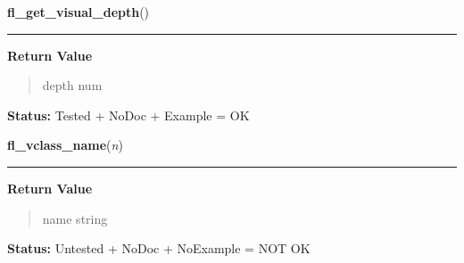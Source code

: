     \label{xformslib:library:fl_get_visual_depth}

    \vspace{0.5ex}

\hspace{.8\funcindent}\begin{boxedminipage}{\funcwidth}

    \raggedright \textbf{fl\_get\_visual\_depth}()

    \vspace{-1.5ex}

    \rule{\textwidth}{0.5\fboxrule}
\setlength{\parskip}{2ex}
\setlength{\parskip}{1ex}
      \textbf{Return Value}
    \vspace{-1ex}

      \begin{quote}
      depth num

      \end{quote}

\textbf{Status:} Tested + NoDoc + Example = OK



    \end{boxedminipage}

    \label{xformslib:library:fl_vclass_name}

    \vspace{0.5ex}

\hspace{.8\funcindent}\begin{boxedminipage}{\funcwidth}

    \raggedright \textbf{fl\_vclass\_name}(\textit{n})

    \vspace{-1.5ex}

    \rule{\textwidth}{0.5\fboxrule}
\setlength{\parskip}{2ex}
\setlength{\parskip}{1ex}
      \textbf{Return Value}
    \vspace{-1ex}

      \begin{quote}
      name string

      \end{quote}

\textbf{Status:} Untested + NoDoc + NoExample = NOT OK



    \end{boxedminipage}

